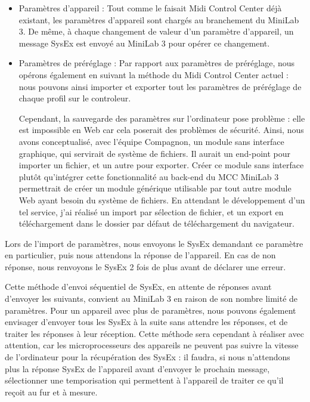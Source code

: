 \documentclass[francais]{rapportPFE}  %
\begin{document}
\begin{itemize}
    \item Paramètres d'appareil :  Tout comme le faisait Midi Control Center déjà existant, les paramètres d'appareil sont chargés au branchement du MiniLab 3. De même, à chaque changement de valeur d'un paramètre d'appareil, un message SysEx est envoyé au MiniLab 3 pour opérer ce changement.
    \item Paramètres de préréglage : Par rapport aux paramètres de préréglage, nous opérons également en suivant la méthode du Midi Control Center actuel : nous pouvons ainsi importer et exporter tout les paramètres de préréglage de chaque profil sur le controleur. 
    
    Cependant, la sauvegarde des paramètres sur l'ordinateur pose problème : elle est impossible en Web car cela poserait des problèmes de sécurité. Ainsi, nous avons conceptualisé, avec l'équipe Compagnon, un module sans interface graphique, qui servirait de système de fichiers. Il aurait un end-point pour importer un fichier, et un autre pour exporter. Créer ce module sans interface plutôt qu'intégrer cette fonctionnalité au back-end du MCC MiniLab 3 permettrait de créer un module générique utilisable par tout autre module Web ayant besoin du système de fichiers. En attendant le développement d'un tel service, j'ai réalisé un import par sélection de fichier, et un export en téléchargement dans le dossier par défaut de téléchargement du navigateur.
\end{itemize}

Lors de l'import de paramètres, nous envoyons le SysEx demandant ce paramètre en particulier, puis nous attendons la réponse de l'appareil. En cas de non réponse, nous renvoyons le SysEx 2 fois de plus avant de déclarer une erreur.

Cette méthode d'envoi séquentiel de SysEx, en attente de réponses avant d'envoyer les suivants, convient au MiniLab 3 en raison de son nombre limité de paramètres. Pour un appareil avec plus de paramètres, nous pouvons également envisager d'envoyer tous les SysEx à la suite sans attendre les réponses, et de traiter les réponses à leur réception. Cette méthode sera cependant à réaliser avec attention, car les microprocesseurs des appareils ne peuvent pas suivre la vitesse de l'ordinateur pour la récupération des SysEx : il faudra, si nous n'attendons plus la réponse SysEx de l'appareil avant d'envoyer le prochain message, sélectionner une temporisation qui permettent à l'appareil de traiter ce qu'il reçoit au fur et à mesure.
\end{document}
